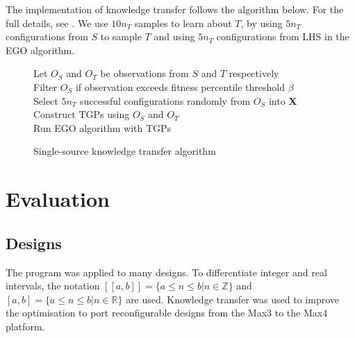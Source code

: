 \documentclass[10pt,a4paper]{article}
\newcommand{\dsb}[1]{[\![#1]\!]}
\begin{document}
The implementation of knowledge transfer follows the algorithm below. For the full details, see . We use $10n_T$ samples\cite{Jones1998} to learn about $T$, by using $5n_T$ configurations from $S$ to sample $T$ and using $5n_T$ configurations from LHS in the EGO algorithm. 
\begin{figure}[H]
	\begin{framed}
		\begin{algorithm}[H]
			Let $O_S$ and $O_T$ be observations from $S$ and $T$ respectively\\
			Filter $O_S$ if observation exceeds fitness percentile threshold $\beta$\\
			Select $5n_T$ successful configurations randomly from $O_S$ into $\mathbf{X}$\\
			Construct TGPs using $O_S$ and $O_T$\\
			Run EGO algorithm with TGPs
		\end{algorithm}		
	\end{framed}
	\caption{Single-source knowledge transfer algorithm}
\end{figure}

\section{Evaluation}

\subsection{Designs}

The program was applied to many designs. To differentiate integer and real intervals, the notation $\dsb{a,b}=\{a\le n\le b|n\in\mathbb{Z}\}$ and $[a,b]=\{a\le n\le b|n\in\mathbb{R}\}$ are used. Knowledge transfer was used to improve the optimisation to port reconfigurable designs from the Max3 to the Max4 platform.
\end{document}
